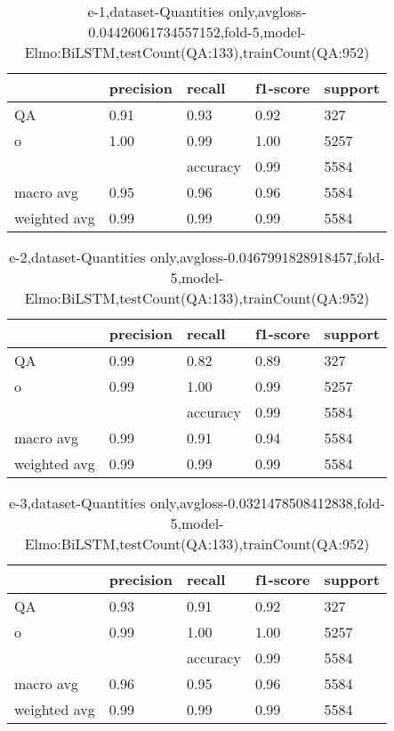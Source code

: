 \begin{table}[!ht] 
\centering
\caption{e-1,dataset-Quantities only,avgloss-0.04426061734557152,fold-5,model-Elmo:BiLSTM,testCount(QA:133),trainCount(QA:952)}\label{e-1data-quantS.tsv}
\begin{tabularx}{300pt}{|X|X|X|X|X|}
\hline
&precision&recall&f1-score&support\\
\hline
QA&0.91&0.93&0.92&327\\
\hline
o&1.00&0.99&1.00&5257\\
\hline
&&accuracy&0.99&5584\\
\hline
macro avg&0.95&0.96&0.96&5584\\
\hline
weighted avg&0.99&0.99&0.99&5584\\
\hline
\end{tabularx}
\end{table}
\begin{table}[!ht] 
\centering
\caption{e-2,dataset-Quantities only,avgloss-0.0467991828918457,fold-5,model-Elmo:BiLSTM,testCount(QA:133),trainCount(QA:952)}\label{e-2data-quantS.tsv}
\begin{tabularx}{300pt}{|X|X|X|X|X|}
\hline
&precision&recall&f1-score&support\\
\hline
QA&0.99&0.82&0.89&327\\
\hline
o&0.99&1.00&0.99&5257\\
\hline
&&accuracy&0.99&5584\\
\hline
macro avg&0.99&0.91&0.94&5584\\
\hline
weighted avg&0.99&0.99&0.99&5584\\
\hline
\end{tabularx}
\end{table}
\begin{table}[!ht] 
\centering
\caption{e-3,dataset-Quantities only,avgloss-0.0321478508412838,fold-5,model-Elmo:BiLSTM,testCount(QA:133),trainCount(QA:952)}\label{e-3data-quantS.tsv}
\begin{tabularx}{300pt}{|X|X|X|X|X|}
\hline
&precision&recall&f1-score&support\\
\hline
QA&0.93&0.91&0.92&327\\
\hline
o&0.99&1.00&1.00&5257\\
\hline
&&accuracy&0.99&5584\\
\hline
macro avg&0.96&0.95&0.96&5584\\
\hline
weighted avg&0.99&0.99&0.99&5584\\
\hline
\end{tabularx}
\end{table}

